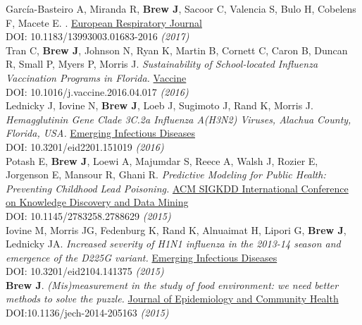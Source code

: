 \documentclass[11pt]{article}
\begin{document}
\noindent García-Basteiro A, Miranda R, \textbf{Brew J}, Sacoor C, Valencia S, Bulo H, Cobelens F, Macete E. . \href{http://erj.ersjournals.com}{European Respiratory Journal} \\
DOI: 10.1183/13993003.01683-2016 \hfill \emph{(2017)} \\

\noindent Tran C, \textbf{Brew J}, Johnson N, Ryan K, Martin B, Cornett C, Caron B, Duncan R, Small P, Myers P, Morris J. \emph{Sustainability of School-located Influenza Vaccination Programs in Florida.} \href{http://www.journals.elsevier.com/vaccine}{Vaccine} \\
DOI: 10.1016/j.vaccine.2016.04.017 \hfill \emph{(2016)} \\

\noindent Lednicky J, Iovine N, \textbf{Brew J}, Loeb J, Sugimoto J, Rand K, Morris J. \emph{Hemagglutinin Gene Clade 3C.2a Influenza A(H3N2) Viruses, Alachua County, Florida, USA.} \href{http://wwwnc.cdc.gov/eid/article/22/1/15-1019_article}{Emerging Infectious Diseases} \\
DOI: 10.3201/eid2201.151019 \hfill \emph{(2016)} \\

\noindent Potash E, \textbf{Brew J}, Loewi A, Majumdar S, Reece A, Walsh J, Rozier E, Jorgenson E, Mansour R, Ghani R. \emph{Predictive Modeling for Public Health: Preventing Childhood Lead Poisoning.} \href{http://dl.acm.org/citation.cfm?id=2788629&dl=ACM&coll=DL&CFID=747855435&CFTOKEN=56343631}{ACM SIGKDD International Conference on Knowledge Discovery and Data Mining} \\  
DOI: 10.1145/2783258.2788629 \hfill \emph{(2015)}\\

\noindent Iovine M, Morris JG, Fedenburg K, Rand K, Alnuaimat H, Lipori G, \textbf{Brew J}, Lednicky JA. \emph{Increased severity of H1N1 influenza in the 2013-14 season and emergence of the D225G variant.} \href{http://wwwnc.cdc.gov/eid/article/21/4/14-1375_article}{Emerging Infectious Diseases} \\
DOI: 10.3201/eid2104.141375 \hfill \emph{(2015)}\\


\noindent \textbf{Brew J}. \emph{(Mis)measurement in the study of food environment: we need better methods to solve the puzzle.} \href{http://jech.bmj.com/}{Journal of Epidemiology and Community Health} \\
DOI:10.1136/jech-2014-205163 \hfill \emph{(2015)}\\
\end{document}
